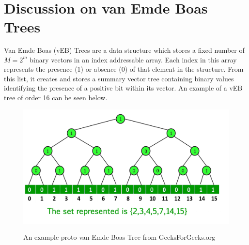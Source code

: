 \documentclass{article}
\begin{document}
\pagebreak
$ $\\$ $\\$ $\\$ $\\$ $\\$ $\\$ $\\$ $\\$ $\\$ $\\$ $\\$ $\\$ $\\$ $\\$ $\\$ $\\$ $\\$ $\\$ $\\$ $\\$ $\\$ $\\$ $\\
\section*{Discussion on van Emde Boas Trees}

Van Emde Boas (vEB) Trees are a data structure which stores a fixed number of ${M = 2^m}$ binary vectors in an index addressable array. Each index in this array represents the presence (1) or absence (0) of that element in the structure. From this list, it creates and stores a summary vector tree containing binary values identifying the presence of a positive bit within its vector. An example of a vEB tree of order 16 can be seen below.

\begin{figure}[h]
    \centering
    \includegraphics[width=\textwidth,keepaspectratio]{Images/vEB_tree_GFG.jpg}
    \label{fig: vEB}
    \caption{An example proto van Emde Boas Tree from GeeksForGeeks.org}
\end{figure}
\end{document}
